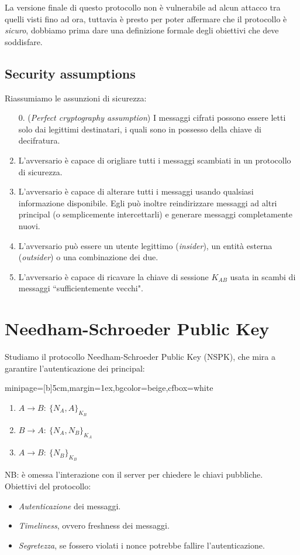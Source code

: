 \documentclass[a4paper, 11pt, notitlepage, fleqn]{report}
\newcommand{\fromto}[2]{#1\rightarrow #2\!:\ }
\newenvironment{colbox}[2]%
{%
	\par\noindent\hspace{10pt}
	\begin{adjustbox}{minipage=[b]{#2},margin=1ex,bgcolor=#1,cfbox=white}
}{%
	\end{adjustbox}\newline%
}
\begin{document}
La versione finale di questo protocollo non è vulnerabile ad alcun attacco tra quelli visti fino ad ora, tuttavia è presto per poter affermare che il protocollo è \emph{sicuro}, dobbiamo prima dare una definizione formale degli obiettivi che deve soddisfare.

\subsection{Security assumptions}
Riassumiamo le assunzioni di sicurezza:
\begin{enumerate}
	\item[0.] (\emph{Perfect cryptography assumption}) I messaggi cifrati possono essere letti solo dai legittimi destinatari, i quali sono in possesso della chiave di decifratura.
	\item L'avversario è capace di origliare tutti i messaggi scambiati in un protocollo di sicurezza.
	\item L'avversario è capace di alterare tutti i messaggi usando qualsiasi informazione disponibile. Egli può inoltre reindirizzare messaggi ad altri principal (o semplicemente intercettarli) e generare messaggi completamente nuovi.
	\item L'avversario può essere un utente legittimo (\emph{insider}), un entità esterna (\emph{outsider}) o una combinazione dei due.
	\item L'avversario è capace di ricavare la chiave di sessione $K_{AB}$ usata in scambi di messaggi ``sufficientemente vecchi".
\end{enumerate}

\clearpage
\section{Needham-Schroeder Public Key}
Studiamo il protocollo Needham-Schroeder Public Key (NSPK), che mira a garantire l'autenticazione dei principal:
\begin{colbox}{beige}{5cm}
	\begin{enumerate}
		\item $\fromto{A}{B}\{N_A,A\}_{K_B}$
		\item $\fromto{B}{A}\{N_A,N_B\}_{K_A}$
		\item $\fromto{A}{B}\{N_B\}_{K_B}$
	\end{enumerate}
\end{colbox}
NB: è omessa l'interazione con il server per chiedere le chiavi pubbliche.\\
Obiettivi del protocollo:
\begin{itemize}
	\item \emph{Autenticazione} dei messaggi.
	\item \emph{Timeliness}, ovvero freshness dei messaggi.
	\item \emph{Segretezza}, se fossero violati i nonce potrebbe fallire l'autenticazione.
\end{itemize}
\end{document}

